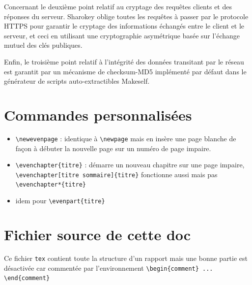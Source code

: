 \documentclass{themeensg}
\newcommand{\ensg}{\textsc{Ensg}}
\begin{document}
Concernant le deuxième point relatif au cryptage des requêtes clients et des réponses du serveur. Sharokey oblige toutes les requêtes à passer par le protocole HTTPS pour garantir le cryptage des informations échangés entre le client et le serveur, et ceci en utilisant une cryptographie asymétrique basée sur l'échange mutuel des clés publiques.

Enfin, le troisième point relatif à l'intégrité des données transitant par le réseau est garantit par un mécanisme de checksum-MD5 implémenté par défaut dans le générateur de scripts auto-extractibles Makeself.

\section{Commandes personnalisées}

\begin{itemize}
\item \verb!\newevenpage! : identique à \verb!\newpage! mais en insère une page blanche de façon à débuter la nouvelle page sur un numéro de page impaire.
\item \verb!\evenchapter{titre}! : démarre un nouveau chapitre sur une page impaire,\\ \verb!\evenchapter[titre sommaire]{titre}! fonctionne aussi mais pas \verb!\evenchapter*{titre}!
\item idem pour \verb!\evenpart{titre}!
\end{itemize}

\section{Fichier source de cette doc}
Ce fichier \texttt{tex} contient toute la structure d'un rapport mais une bonne partie est désactivée car commentée par l'environnement \verb!\begin{comment} ... \end{comment}!
\end{document}
